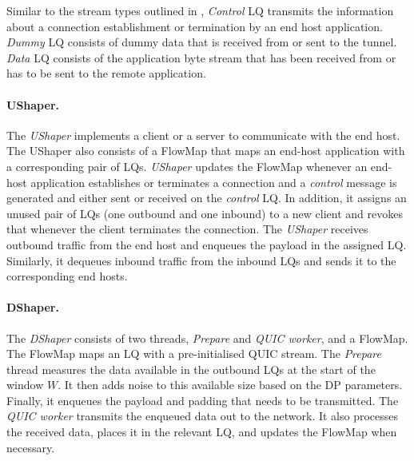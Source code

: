 Similar to the stream types outlined in , \textit{Control} LQ transmits the information about a connection establishment or termination by an end host application. 
\textit{Dummy} LQ consists of dummy data that is received from or sent to the tunnel.
\textit{Data} LQ consists of the application byte stream that has been received from or has to be sent to the remote application.


\paragraph{UShaper.}
The \textit{UShaper} implements a client or a server to communicate with the end host.
The UShaper also consists of a FlowMap that maps an end-host application with a corresponding pair of LQs.
\textit{UShaper} updates the FlowMap whenever an end-host application establishes or terminates a connection and a \textit{control} message is generated and either sent or received on the \textit{control} LQ.
In addition, it assigns an unused pair of LQs (one outbound and one inbound) to a new client and revokes that whenever the client terminates the connection.
The \textit{UShaper} receives outbound traffic from the end host and enqueues the payload in the assigned LQ.
Similarly, it dequeues inbound traffic from the inbound LQs and sends it to the corresponding end hosts.

\paragraph{DShaper.}
The \textit{DShaper} consists of two threads, \textit{Prepare} and \textit{QUIC worker}, and a FlowMap.
The FlowMap maps an LQ with a pre-initialised QUIC stream.
The \textit{Prepare} thread measures the data available in the outbound LQs at the start of the window $W$.
It then adds noise to this available size based on the DP parameters.
Finally, it enqueues the payload and padding that needs to be transmitted.
The \textit{QUIC worker} transmits the enqueued data out to the network.
It also processes the received data, places it in the relevant LQ, and updates the FlowMap when necessary.

